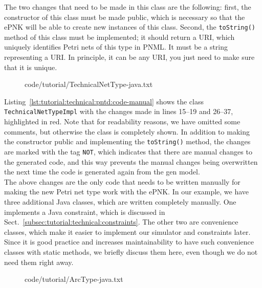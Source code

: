 The two changes that need to be made in this class are the following: first,
the constructor of this class must be made public, which is necessary so that
the ePNK will be able to create new instances of this class. Second, the
{\tt toString()} method of this class must be implemented; it should return a
URI, which uniquely identifies Petri nets of this type in PNML. It must be
a string representing a URI. In principle, it can be any URI, you just need to
make sure that it is unique.

\begin{figure}[htbp!]
  {code/tutorial/TechnicalNetType-java.txt}
\end{figure}

Listing~\ref{lst:tutorial:technical:pntd:code-manual} shows the class
{\tt TechnicalNetTypeImpl}  with the changes made in lines 15--19 and 26--37,
highlighted in red. Note that for readability reasons, we have omitted some
comments, but otherwise the class is completely shown. In addition to
making the constructor public and implementing the {\tt toString()} method,
the changes are marked with the tag {\tt \@generated NOT}, which indicates
that there are manual changes to the generated code, and this way prevents the
manual changes being overwritten the next time the code is generated again
from the gen model.\\

The above changes are the only code that needs to be written manually for making
the new Petri net type work with the ePNK. In our example, we have three
additional Java classes, which are written completely manually. One implements
a Java constraint, which is discussed in
Sect.~\ref{subsec:tutorial:technical:constraints}. The other two are convenience
classes, which make it easier to implement our simulator and constraints later.
Since it is good practice and increases maintainability to have such convenience
classes with static methods, we briefly discuss them here, even though we do not
need them right away.

\begin{figure}[htbp!]
%
  {code/tutorial/ArcType-java.txt}
\end{figure}

